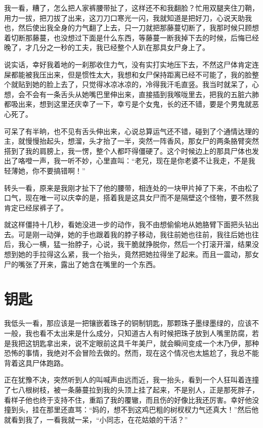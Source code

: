我一看，糟了，怎么把人家裤腰带扯了，这样还不和我翻脸？忙用双腿夹住刀鞘，用力一拔，把刀拔了出来，这刀刀口寒光一闪，我就知道是把好刀，心说天助我也，然后使出我全身的力气翻了上去，只一刀就把那藤蔓切断了，我那时候只顾想着切断那藤蔓，也没想过下面是什么东西，等藤蔓一断我掉下去的时候，后悔已经晚了，才几分之一秒的工夫，我已经整个人趴在那具女尸身上了。

说实话，幸好我着地的一刹那收住力气，没有实打实地压下去，不然这尸体肯定连屎都能被我压出来，但是惯性太大，我想和女尸保持距离已经不可能了，我的脸整个就贴到她的脸上去了，只觉得冰凉冰凉的，冷得我汗毛直竖。我当时就呆了，心想，会不会有一条舌头从她嘴巴里伸出来，直接插到我喉咙里去，把我的五脏六肺都吸出来，想到这里还庆幸了一下，幸亏是个女鬼，长的还不错，要是个男鬼就恶心死了。

可呆了有半晌，也不见有舌头伸出来，心说总算运气还不错，碰到了个通情达理的主，就慢慢抬起头，想溜，头才抬了一半，突然一阵香风，那女尸的两条胳臂突然搭到了我的肩膀上，我一愣，整个人都吓得僵硬了。这个时候边上的那具尸体也发出了咯噔一声，我一听不妙，心里直叫：“老兄，现在是你老婆不让我走，不是我轻薄她，你不要搞错啊！”

转头一看，原来是我刚才扯下了他的腰带，相连处的一块甲片掉了下来，不由松了口气，现在唯一可以庆幸的是，搭着我是这具女尸而不是隔壁这个怪物，要不然我肯定已经尿裤子了。

就这样僵持十几秒，看她没进一步的动作，我不由想偷偷地从她胳臂下面把头钻出去。可是刚一动弹，她的手也跟着我的脖子移动，我往前她也往前，我往后她也往后，我心一横，猛一抬脖子，心说，我干脆就挣脱你，然后一个打滚开溜，结果没想到她的手拉得这么紧，我一个抬头，竟然把她拉得坐了起来。而且一震动，那女尸的嘴张了开来，露出了她含在嘴里的一个东西。

\chapter{钥匙}

我低头一看，那应该是一把镶嵌着珠子的铜制钥匙，那颗珠子墨绿墨绿的，应该不一般，我也看不太出来是什么成分，只知道古人有时候把珠子放到人嘴里防腐，若是我把这钥匙拿出来，说不定眼前这具千年美尸，就会瞬间变成一个木乃伊，那种恐怖的事情，我绝对不会冒险去做的。然而，现在这个情况也太尴尬了，我总不能背着这具尸体跑路。

正在犹豫不决，突然听到人的叫喊声由远而近，我一抬头，看到一个人狂叫着连撞了七八根树枝，被一条藤蔓拉到我的头顶上挂了起来，不是别人，正是那死胖子，看样子他也终于支持不住，重蹈了我的覆辙，而且伤的好像比我还厉害。幸好他没撞到头，挂在那里还直骂：“妈的，想不到这鸡巴粗的树杈杈力气还真大！”然后他就看到我了，一看我就一呆，“小同志，在花姑娘的干活？”

